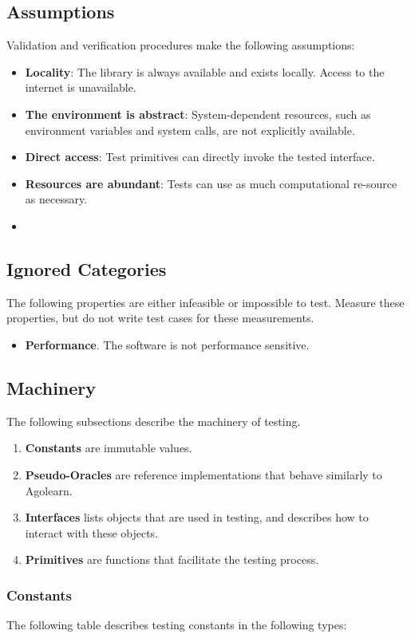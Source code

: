 \documentclass[12pt, titlepage]{article}
\begin{document}
\subsection{Assumptions}
Validation and verification procedures make the following assumptions:
\begin{itemize}
  \item \textbf{Locality}: The library is always available and exists locally. Access to the internet is unavailable.
  \item \textbf{The environment is abstract}: System-dependent resources, such as environment variables and system calls, are not explicitly available.
  \item \textbf{Direct access}: Test primitives can directly invoke the tested interface.
  \item \textbf{Resources are abundant}: Tests can use as much computational re-source as necessary.
  \item 
\end{itemize}

\subsection{Ignored Categories}
The following properties are either infeasible or impossible to test. Measure these properties, but do not write test cases for these measurements.
\begin{itemize}
  \item \textbf{Performance}. The software is not performance sensitive.
\end{itemize}

\subsection{Machinery}
The following subsections describe the machinery of testing.
\begin{enumerate}
  \item \textbf{Constants} are immutable values.
  \item \textbf{Pseudo-Oracles} are reference implementations that behave similarly to Agolearn.
  \item \textbf{Interfaces} lists objects that are used in testing, and describes how to interact with these objects.
  \item \textbf{Primitives} are functions that facilitate the testing process.
\end{enumerate}

\subsubsection{Constants}
The following table describes testing constants in the following types:
\end{document}
